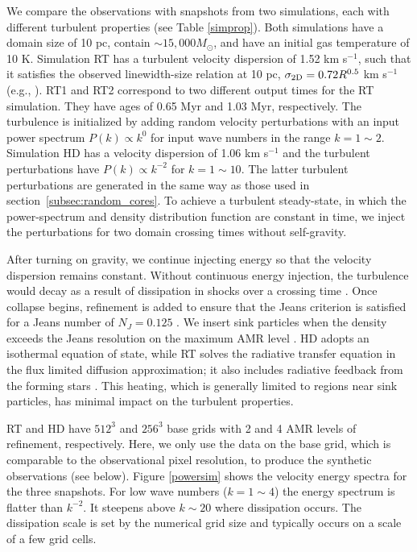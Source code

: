 \documentclass[iop,revtex4]{emulateapj}
\begin{document}
We compare the observations with snapshots from two simulations, each with different turbulent properties (see Table \ref{simprop}). Both simulations have a domain size of 10 pc, contain $\sim 15,000 M_{\odot}$, and have an initial gas temperature of 10 K. Simulation  RT has a turbulent velocity dispersion of 1.52 km s$^{-1}$, such that it satisfies the observed linewidth-size relation at 10 pc, $\sigma_{\rm 2D}= 0.72 R^{0.5}$ km s$^{-1}$ (e.g., \citealt{mckee07}). RT1 and RT2 correspond to two different output times for the RT simulation. They have ages of 0.65 Myr and  1.03 Myr, respectively. The turbulence is initialized by adding random velocity perturbations with an input power spectrum $P(k) \propto k^{0}$ for input wave numbers in the range $k=1\sim 2$. Simulation HD has a velocity dispersion of 1.06 km s$^{-1}$ and the turbulent perturbations have $P(k) \propto k^{-2}$ for $k=1\sim 10$. The latter turbulent perturbations are generated in the same way as those used in section~\ref{subsec:random_cores}. To achieve a turbulent steady-state, in which the power-spectrum and density distribution function are constant in time, we inject the perturbations for two domain crossing times without self-gravity.

After turning on gravity, we continue injecting energy so that the velocity dispersion remains constant. Without continuous energy injection, the turbulence would decay as a result of dissipation in shocks over a crossing time \citep[e.g.][]{Stone1998,MacLow1999}. Once collapse begins, refinement is added to ensure that the Jeans criterion is satisfied for a Jeans number of $N_J=0.125$ \citep{truelove97}. We insert sink particles when the density exceeds the Jeans resolution on the maximum AMR level \citep{krumholz04}. HD adopts an isothermal equation of state, while RT solves the radiative transfer equation in the flux limited diffusion approximation; it also includes radiative feedback from the forming stars \citep{krumholz07,Offner09}. This heating, which is generally limited to regions near sink particles, has minimal impact on the turbulent properties.

RT and HD have $512^3$ and $256^3$ base grids with 2 and 4 AMR levels of refinement, respectively. Here, we only use the data on the base grid, which is comparable to the observational pixel resolution, to produce the synthetic observations (see below). Figure \ref{powersim} shows the velocity energy spectra for the three snapshots. For low wave numbers ($k=1\sim 4$) the energy spectrum is flatter than $k^{-2}$. It steepens above $k\sim 20$ where dissipation occurs. The dissipation scale is set by the numerical grid size and typically occurs on a scale of a few grid cells.
\end{document}
